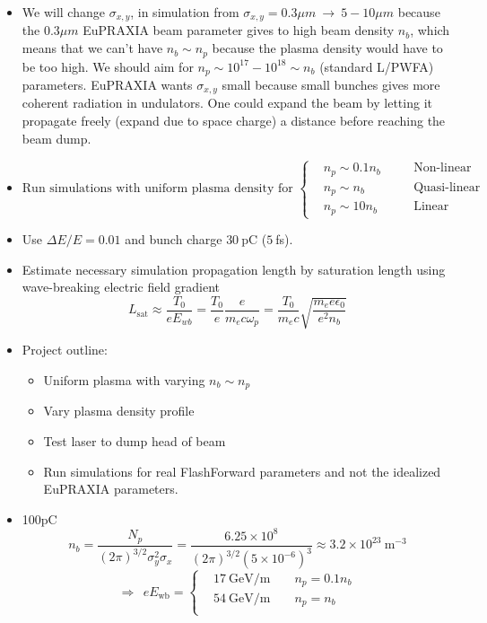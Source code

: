 \documentclass[%
onecolumn, notitlepage,
 amsmath,amssymb,
 aps,
]{article}
\begin{document}
\begin{itemize}
\item We will change $\sigma_{x,y}$, in simulation from $\sigma_{x,y}=0.3 \mu m ~\to~5-10 \mu m$ because the $0.3\mu m$ EuPRAXIA beam parameter gives to high beam density $n_b$, which means that we can't have $n_b\sim n_p$ because the plasma density would have to be too high. We should aim for $n_p\sim 10^{17}-10^{18}\sim n_b$ (standard L/PWFA) parameters. 
EuPRAXIA wants $\sigma_{x,y}$ small because small bunches gives more coherent radiation in undulators. One could expand the beam by letting it propagate freely (expand due to space charge) a distance before reaching the beam dump. 
\item $\text{Run simulations with uniform plasma density for }\left\{\begin{aligned}
&n_p\sim 0.1 n_b \quad &&\text{Non-linear}\\
&n_p\sim  n_b\quad &&\text{Quasi-linear}\\
&n_p\sim 10 n_b\quad &&\text{Linear}
\end{aligned}\right.$ \\
\item Use $\Delta E/E=0.01$ and bunch charge $30~$pC ($5~$fs).\\
\item Estimate necessary simulation propagation length by saturation length using wave-breaking electric field gradient 
$$L_{\text{sat}}\approx \frac{T_0}{eE_{wb}}=\frac{T_0}{e}\frac{e}{m_e c\omega_p}=\frac{T_0}{m_e c}\sqrt{\frac{m_e e\epsilon_0}{e^2n_b}} $$ 
\item Project outline:
\begin{itemize}
\item Uniform plasma with varying $n_b\sim n_p$
\item Vary plasma density profile
\item Test laser to dump head of beam
\item Run simulations for real FlashForward parameters and not the idealized EuPRAXIA parameters.
\end{itemize}
\item  100pC $$n_b=\frac{N_p}{(2\pi)^{3/2} \sigma_y^2\sigma_x}=\frac{6.25\times 10^{8}}{(2\pi)^{3/2} (5\times 10^{-6})^3}\approx 3.2\times 10^{23}~ \text{m}^{-3} $$
$$\Rightarrow ~~eE_{\text{wb}}=\left\{\begin{aligned}
&17 ~\text{GeV/m }&& n_p=0.1 n_b \\
&54 ~\text{GeV/m} && n_p=n_b\\

\end{aligned}$$
\end{itemize}
\end{document}
